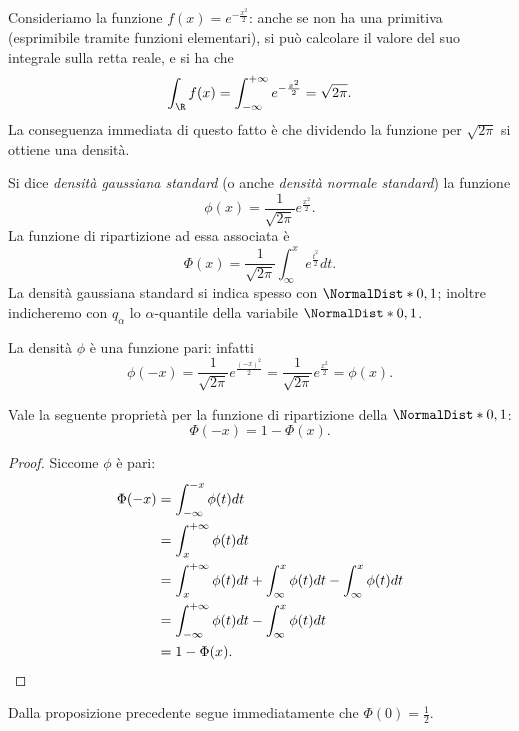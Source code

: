 Consideriamo la funzione $f(x) = e^{-\frac{x^2}{2}}$: anche se non ha una primitiva (esprimibile tramite funzioni elementari), si può calcolare il valore del suo integrale sulla retta reale, e si ha che \[
    \int_{\R} f(x) = \int_{-\infty}^{+\infty} e^{-\frac{x^2}{2}} = \sqrt{2\pi}.    
\] La conseguenza immediata di questo fatto è che dividendo la funzione per $\sqrt{2\pi}$ si ottiene una densità.

\begin{definition}
     Si dice \emph{densità gaussiana standard} (o anche \emph{densità normale standard}) la funzione \[
        \phi(x) = \frac{1}{\sqrt{2\pi}}e^{\frac{x^2}{2}}.    
    \] La funzione di ripartizione ad essa associata è \[
        \Phi(x) = \frac{1}{\sqrt{2\pi}}\int_{\infty}^x e^{\frac{t^2}{2}}dt.
    \] La densità gaussiana standard si indica spesso con $\NormalDist*{0, 1}$; inoltre indicheremo con $q_\alpha$ lo $\alpha$-quantile della variabile $\NormalDist*{0, 1}$.
\end{definition}

\begin{remark}
    La densità $\phi$ è una funzione pari: infatti \[
        \phi(-x) = \frac{1}{\sqrt{2\pi}}e^{\frac{(-x)^2}{2}} =  \frac{1}{\sqrt{2\pi}}e^{\frac{x^2}{2}} = \phi(x).
    \]
\end{remark}

\begin{proposition}
    Vale la seguente proprietà per la funzione di ripartizione della $\NormalDist*{0, 1}$: \[
        \Phi(-x) = 1 - \Phi(x).    
    \]
\end{proposition}
\begin{proof} Siccome $\phi$ è pari:
    \begin{align*}
        \Phi(-x) &= \int_{-\infty}^{-x} \phi(t)dt \\
        &= \int_x^{+\infty} \phi(t)dt \\
        &= \int_x^{+\infty} \phi(t)dt + \int_{\infty}^{x} \phi(t)dt - \int_{\infty}^{x} \phi(t)dt\\
        &= \int_{-\infty}^{+\infty} \phi(t)dt - \int_{\infty}^{x} \phi(t)dt\\
        &= 1 - \Phi(x). \qedhere
    \end{align*}
\end{proof}
\begin{remark}
    Dalla proposizione precedente segue immediatamente che $\Phi(0) = \frac{1}{2}$.
\end{remark}


